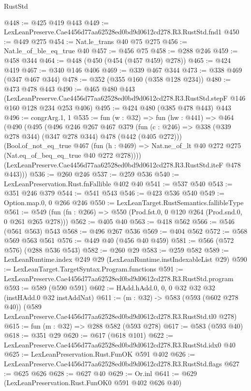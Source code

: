 \begin{lexlean}{RustStd}
\begin{coremodule}
@448 := @425 @419 @443
@449 := LexLeanPreserve.Cae4456d77aa62528ed0bd9d0612cd278.R3.RustStd.fnd1
@450 := @449 @275
@454 := Nat.le_trans @40 @75 @275
@456 := Nat.le_of_ble_eq_true @40
@457 := @456 @75
@458 := @288 @246
@459 := @458 @344
@464 := @448 (@450 (@454 (@457 @459) @278))
@465 := @424 @419
@467 := @340 @146 @406
@469 := @339 @467 @344
@473 := @338 @469 (@347 @467 @344)
@478 := @352 (@355 @160 (@358 @128 @234))
@480 := @473 @478 @443
@490 := @465
    @480
    @443
    (LexLeanPreserve.Cae4456d77aa62528ed0bd9d0612cd278.R3.RustStd.stepF
      @146
      @160
      @128
      @234
      @253
      @406)
@495 := @424 @480 (@385 @478 @443) @443
@496 := congrArg.{1, 1}
@535 := fun (w : @32) =>
  fun (hw : @441) =>
  @464
    (@490
      (@495
        (@496
          @246
          @267
          @467
          @379
          (fun (c : @246) => @338 (@339 @278 @344) (@347 @278 @344) @478 (@442 (@405 @272)))
          (Bool.of_not_eq_true
            @467
            (fun (h : @469) => Nat.ne_of_lt @40 @272 @275 (Nat.eq_of_beq_eq_true @40 @272 @278))))
        (LexLeanPreserve.Cae4456d77aa62528ed0bd9d0612cd278.R3.RustStd.iteF @478 @443)))
@536 := @260 @246
@537 := @259 @536
@540 := LexLeanPreservation.Rust.fnFallible @402 @40
@541 := @537 @540
@543 := @351 @246 @379
@544 := @541 @543
@546 := @423 @536 @540
@549 := Option.map.{0, 0} @266 @246
@550 := LexLeanTarget.RustSemantics.fallibleType
@561 := @549 (fun (fn : @266) => @550 (Prod.fst.{0, 0} @120 @264 (Prod.snd.{0, 0} @261 @265 @278)))
@562 := @405 @40
@563 := @418 @562
@566 := @546 (@561 @563) @543
@568 := @496 @267 @536
@569 := @404 @562
@572 := @568 @569 @563 @561
@576 := @449 @40 (@456 @40 @459)
@581 := @566 (@572 @576) (@288 @536 @543)
@582 := @260 @29
@583 := @259 @582
@589 := LexLeanRuntime.index @249 @29 (LexLeanRuntime.instIndexableList @29)
@590 := LexLeanTarget.TargetSyntax.Program.functions
@591 := LexLeanPreserve.Cae4456d77aa62528ed0bd9d0612cd278.R3.RustStd.program
@593 := @589 (@590 @591)
@602 := HAdd.hAdd.{0, 0, 0} @32 @32 @32 (instHAdd.{0} @32 instAddNat)
@611 := (m : @32) ->
  @583
    (@593 (@602 @278 @40))
    (@589 LexLeanPreserve.Cae4456d77aa62528ed0bd9d0612cd278.R3.RustStd.tl0 @278)
@615 := fun (m : @32) => @288 @582 (@593 @278)
@617 := @583 (@593 @40)
@618 := @351 @29
@620 := @617 (@618 @101)
@622 := LexLeanPreserve.Cae4456d77aa62528ed0bd9d0612cd278.R3.RustStd.idx0 @40
@625 := LexLeanPreservation.Rust.FunOK @591 @402
@626 := LexLeanPreserve.Cae4456d77aa62528ed0bd9d0612cd278.R3.RustStd.flags
@627 := @625 @626
@628 := @627 @40
@629 := Or.inl
@641 := @629
    (LexLeanPreservation.Rust.FunOK0 @591 @402 @626 @40)

\end{coremodule}
\end{lexlean}
